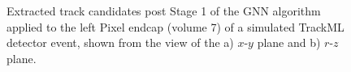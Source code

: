 \begin{figure}[htbp]%
    \centering
    \hfill
    \caption{Extracted track candidates post Stage 1 of the GNN algorithm applied to the left Pixel endcap (volume 7) of a simulated TrackML detector event, shown from the view of the a) $x$-$y$ plane and b) $r$-$z$ plane. }%
    \label{fig:trackml-results-endcap-extracted}%
\end{figure}

